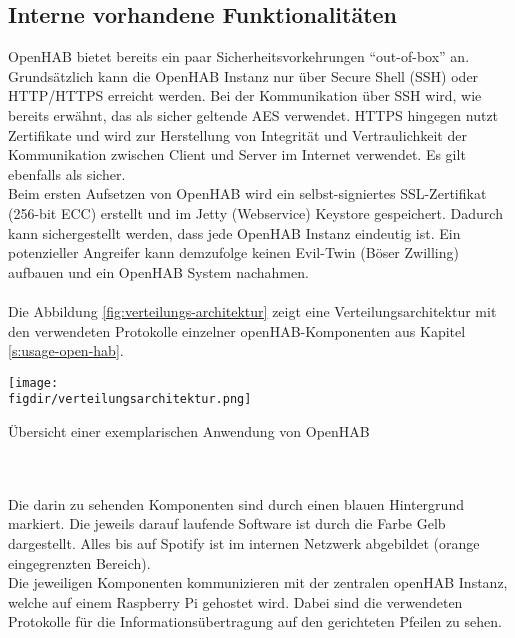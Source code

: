 \subsection{Interne vorhandene Funktionalitäten}
OpenHAB bietet bereits ein paar Sicherheitsvorkehrungen "`out-of-box"' an. Grundsätzlich kann die OpenHAB Instanz nur über Secure Shell (SSH) oder HTTP/HTTPS erreicht werden. Bei der Kommunikation über SSH wird, wie bereits erwähnt, das als sicher geltende AES verwendet. HTTPS hingegen nutzt Zertifikate und wird zur Herstellung von Integrität und Vertraulichkeit der Kommunikation zwischen Client und Server im Internet verwendet. Es gilt ebenfalls als sicher.\\
Beim ersten Aufsetzen von OpenHAB wird ein selbst-signiertes SSL-Zertifikat (256-bit ECC) erstellt und im Jetty (Webservice) Keystore gespeichert. Dadurch kann sichergestellt werden, dass jede OpenHAB Instanz eindeutig ist. Ein potenzieller Angreifer kann demzufolge keinen Evil-Twin (Böser Zwilling) aufbauen und ein OpenHAB System nachahmen.\\
\\
Die Abbildung \ref{fig:verteilungs-architektur} zeigt eine Verteilungsarchitektur mit den verwendeten Protokolle einzelner openHAB-Komponenten aus Kapitel \ref{s:usage-open-hab}.\\
\begin{minipage}{\textwidth}
	\centering
	\captionsetup{type=figure}
	\texttt{[image: \\figdir/verteilungsarchitektur.png]}
	\caption{Übersicht einer exemplarischen Anwendung von OpenHAB \label{fig:verteilungs-architektur}}
\end{minipage}
\\
\\
Die darin zu sehenden Komponenten sind durch einen blauen Hintergrund markiert. Die jeweils darauf laufende Software ist durch die Farbe Gelb dargestellt. Alles bis auf Spotify ist im internen Netzwerk abgebildet (orange eingegrenzten Bereich).\\
Die jeweiligen Komponenten kommunizieren mit der zentralen openHAB Instanz, welche auf einem Raspberry Pi gehostet wird. Dabei sind die verwendeten Protokolle für die Informationsübertragung auf den gerichteten Pfeilen zu sehen.

